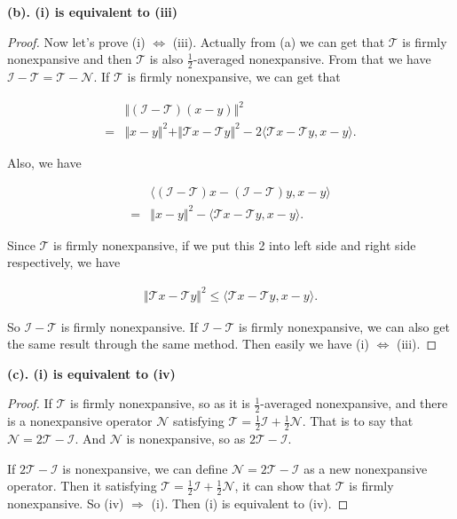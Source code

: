 \documentclass{report}
\begin{document}
\par {\bf (b). (i) is equivalent to (iii)}

\begin{proof}

    \par Now let's prove (i) $\Leftrightarrow$ (iii). 
    Actually from (a) we can get that $\mathcal{T}$ is firmly nonexpansive and then $\mathcal{T}$ is also $\frac{1}{2}$-averaged nonexpansive. 
    From that we have $\mathcal{I}-\mathcal{T}=\mathcal{T}-\mathcal{N}$. 
    If $\mathcal{T}$ is firmly nonexpansive,
    we can get that 

    \begin{align*}
        &\Vert (\mathcal{I}-\mathcal{T})(x-y)\Vert^2\\
        =&\Vert x-y\Vert^2 +\Vert \mathcal{T}x-\mathcal{T}y\Vert^2 -2\langle \mathcal{T}x-\mathcal{T}y,x-y\rangle.
    \end{align*}

    \par Also, we have 

    \begin{align*}
        &\langle (\mathcal{I}-\mathcal{T})x-(\mathcal{I}-\mathcal{T})y,x-y\rangle \\
        =&\Vert x-y\Vert ^2 -\langle \mathcal{T}x-\mathcal{T}y,x-y\rangle.
    \end{align*}

    Since $\mathcal{T}$ is firmly nonexpansive, 
    if we put this 2 into left side and right side respectively, we have 

    \begin{align*}
        \Vert \mathcal{T}x-\mathcal{T}y\Vert^2 \leq \langle \mathcal{T}x-\mathcal{T}y,x-y\rangle.
    \end{align*}

    So $\mathcal{I}-\mathcal{T}$ is firmly nonexpansive. 
    If $\mathcal{I}-\mathcal{T}$ is firmly nonexpansive, we can also get the same result through the same method. 
    Then easily we have (i) $\Leftrightarrow$ (iii).
\end{proof}

\par {\bf (c). (i) is equivalent to (iv)} 
\begin{proof}
    If $\mathcal{T}$ is firmly nonexpansive, so as it is $\frac{1}{2}$-averaged nonexpansive, 
    and there is a nonexpansive operator $\mathcal{N}$ satisfying 
    $\mathcal{T}=\frac{1}{2}\mathcal{I}+\frac{1}{2}\mathcal{N}$.
    That is to say that $\mathcal{N}=2\mathcal{T}-\mathcal{I}$. 
    And $\mathcal{N}$ is nonexpansive, so as $2\mathcal{T}-\mathcal{I}$.
    \vspace{0.5em}

    \par If $2\mathcal{T}-\mathcal{I}$ is nonexpansive, we can define $\mathcal{N}=2\mathcal{T}-\mathcal{I}$ as a new nonexpansive operator. 
    Then it satisfying $\mathcal{T}=\frac{1}{2}\mathcal{I}+\frac{1}{2}\mathcal{N}$, it can show that $\mathcal{T}$ is firmly nonexpansive. 
    So (iv) $\Rightarrow$ (i). 
    Then (i) is equivalent to (iv).
\end{proof}
\end{document}
